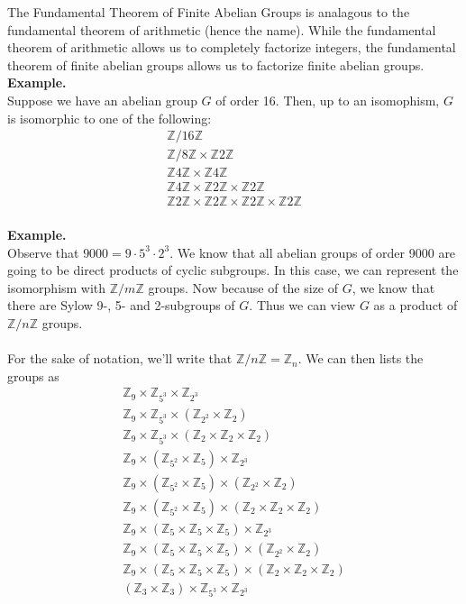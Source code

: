 \documentclass[12pt,letterpaper]{algebra_book}
\newcommand{\ZZ}{\mathbb{Z}}
\theoremstyle{definition}
\begin{document}
    The Fundamental Theorem of Finite Abelian Groups is
    analagous to the fundamental theorem of arithmetic (hence the
    name). While the fundamental theorem of arithmetic allows us to
    completely factorize integers, the fundamental theorem of finite
    abelian groups allows us to factorize finite abelian groups.
    \\
    \textbf{Example.}
    \\
    Suppose we have an abelian group $G$ of order 16. Then, up to an
    isomophism, $G$ is isomorphic to one of the following:
    \begin{gather*}
        \ZZ/16\ZZ\\
        \ZZ/8\ZZ \times \ZZ2\ZZ\\
        \ZZ4\ZZ \times \ZZ4\ZZ\\
        \ZZ4\ZZ \times \ZZ2\ZZ \times \ZZ2\ZZ\\
        \ZZ2\ZZ \times \ZZ2\ZZ \times \ZZ2\ZZ \times \ZZ2\ZZ
    \end{gather*}
    \\
    \textbf{Example.}
    \\
    Observe that $9000= 9\cdot 5^3 \cdot 2^3$. We know that all abelian groups of order 9000 are going to
    be direct products of cyclic subgroups. In this case, we can
    represent the isomorphism with $\mathbb{Z}/m\mathbb{Z}$ groups.
    Now because of the size of
    $G$, we know that there are Sylow 9-, 5- and 2-subgroups of $G$. Thus
    we can view $G$ as a
    product of $\mathbb{Z}/n\mathbb{Z}$ groups.\\
    \\
    For the sake of
    notation, we'll write that $\mathbb{Z}/n\mathbb{Z} =
    \mathbb{Z}_n$. We can then lists the groups as 
    \setcounter{equation}{0}
    \begin{gather}
        \ZZ_9 \times \ZZ_{5^3} \times \ZZ_{2^3}\\
        \ZZ_9 \times \ZZ_{5^3} \times (\ZZ_{2^2} \times \ZZ_2)\\
        \ZZ_9 \times \ZZ_{5^3} \times (\ZZ_{2} \times \ZZ_2 \times \ZZ_2)\\
        \ZZ_9 \times (\ZZ_{5^2} \times \ZZ_5) \times \ZZ_{2^3} \\
        \ZZ_9 \times (\ZZ_{5^2} \times \ZZ_5) \times (\ZZ_{2^2} \times \ZZ_2)\\
        \ZZ_9 \times (\ZZ_{5^2} \times \ZZ_5) \times (\ZZ_{2} \times \ZZ_2 \times \ZZ_2)\\
        \ZZ_9 \times (\ZZ_{5} \times \ZZ_5 \times \ZZ_5) \times \ZZ_{2^3} \\
        \ZZ_9 \times (\ZZ_{5} \times \ZZ_5 \times \ZZ_5) \times (\ZZ_{2^2} \times \ZZ_2)\\
        \ZZ_9 \times (\ZZ_{5} \times \ZZ_5 \times \ZZ_5) \times (\ZZ_{2} \times \ZZ_2 \times \ZZ_2)\\
        (\ZZ_3 \times \ZZ_3) \times \ZZ_{5^3} \times \ZZ_{2^3}
    \end{gather}
\end{document}

